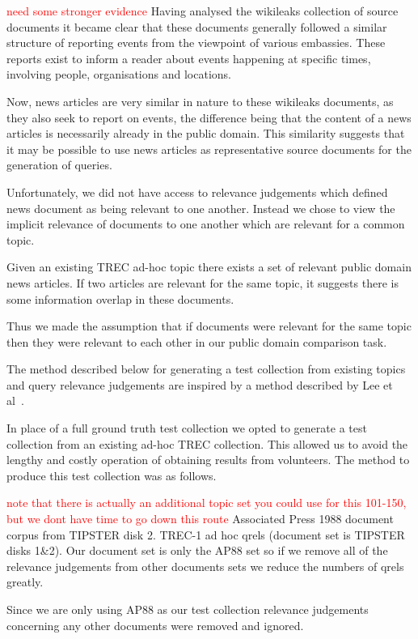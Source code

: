 \documentclass{mpaper}
\let\oldcite=\cite
\renewcommand\cite[1]{\ifthenelse{\equal{#1}{NEEDED}}{\ensuremath{^\texttt{[citation~needed]}}}{\oldcite{#1}}}
\newcommand{\remove}[1]{\textcolor{red}{#1}}
\begin{document}
\remove{need some stronger evidence}
Having analysed the wikileaks collection of source documents it became clear that these documents generally followed a similar structure of reporting events from the viewpoint of various embassies. These reports exist to inform a reader about events happening at specific times, involving people, organisations and locations.

Now, news articles are very similar in nature to these wikileaks documents, as they also seek to report on events, the difference being that the content of a news articles is necessarily already in the public domain.
This similarity suggests that it may be possible to use news articles as representative source documents for the generation of queries.

Unfortunately, we did not have access to relevance judgements which defined news document as being relevant to one another.
Instead we chose to view the implicit relevance of documents to one another which are relevant for a common topic.

Given an existing TREC ad-hoc topic there exists a set of relevant public domain news articles. If two articles are relevant for the same topic, it suggests there is some information overlap in these documents.

Thus we made the assumption that if documents were relevant for the same topic then they were relevant to each other in our public domain comparison task.

The method described below for generating a test collection from existing topics and query relevance judgements are inspired by a method described by Lee et al~\cite{GeneratingQueriesLee12}.

In place of a full ground truth test collection we opted to generate a test collection from an existing ad-hoc TREC collection. This allowed us to avoid the lengthy and costly operation of obtaining results from volunteers.
The method to produce this test collection was as follows.

\remove{note that there is actually an additional topic set you could use for this 101-150, but we dont have time to go down this route}
Associated Press 1988 document corpus from TIPSTER disk 2.
TREC-1 ad hoc qrels (document set is TIPSTER disks 1\&2).
Our document set is only the AP88 set so if we remove all of the relevance judgements from other documents sets we reduce the numbers of qrels greatly.

Since we are only using AP88 as our test collection relevance judgements concerning any other documents were removed and ignored.
\end{document}
